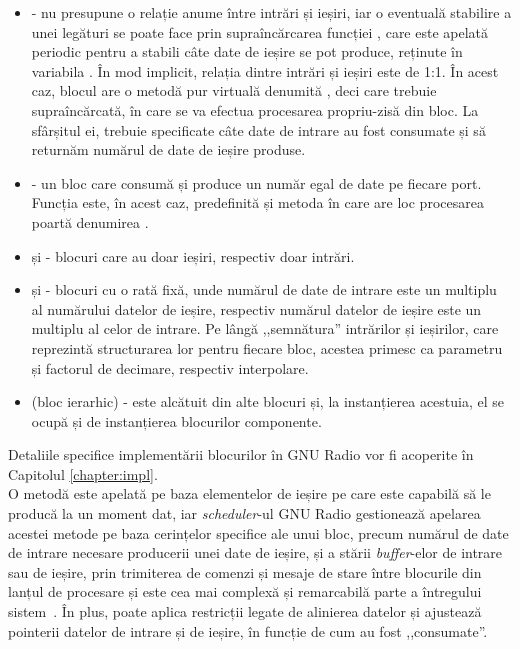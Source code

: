 \begin{itemize}
  \item {} - nu presupune o relație anume între intrări și ieșiri,
  iar o eventuală stabilire a unei legături se poate face prin supraîncărcarea
  funcției , care este apelată periodic pentru a stabili câte
  date de ieșire se pot produce, reținute în variabila . În
  mod implicit, relația dintre intrări și ieșiri este de 1:1. În acest caz,
  blocul are o metodă pur virtuală denumită , deci care
  trebuie supraîncărcată, în care se va efectua procesarea propriu-zisă din
  bloc. La sfârșitul ei, trebuie specificate câte date de intrare au fost
  consumate și să returnăm numărul de date de ieșire produse.

  \item {} - un bloc care consumă și produce un număr egal de date pe
  fiecare port. Funcția  este, în acest caz, predefinită și
  metoda în care are loc procesarea poartă denumirea . 

  \item {} și  - blocuri care au doar ieșiri, respectiv
  doar intrări. 

  \item {} și  - blocuri cu o rată fixă, unde
  numărul de date de intrare este un multiplu al numărului datelor de ieșire,
  respectiv numărul datelor de ieșire este un multiplu al celor de intrare. Pe
  lângă ,,semnătura'' intrărilor și ieșirilor, care reprezintă structurarea lor
  pentru fiecare bloc, acestea primesc ca parametru și factorul de decimare,
  respectiv interpolare.

  \item {} (bloc ierarhic) - este alcătuit din alte blocuri și,
  la instanțierea acestuia, el se ocupă și de instanțierea blocurilor
  componente.
\end{itemize}

Detaliile specifice implementării blocurilor în GNU Radio vor fi acoperite în
Capitolul \ref{chapter:impl}. \\

O metodă  este apelată pe baza elementelor de ieșire pe care este capabilă
să le producă la un moment dat, iar \textit{scheduler}-ul GNU Radio gestionează
apelarea acestei metode pe baza cerințelor specifice ale unui bloc, precum
numărul de date de intrare necesare producerii unei date de ieșire, și a stării
\textit{buffer}-elor de intrare sau de ieșire, prin trimiterea de comenzi și
mesaje de stare între blocurile din lanțul de procesare și este cea mai complexă
și remarcabilă parte a întregului sistem~\cite{gnuradio-scheduler}. În plus,
poate aplica restricții legate de alinierea datelor și ajustează pointerii
datelor de intrare și de ieșire, în funcție de cum au fost ,,consumate''. \\

